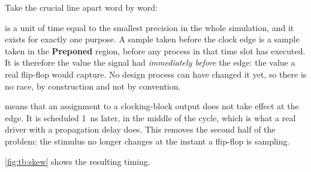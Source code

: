 Take the crucial line apart word by word:


\textbf{} is a unit of time equal to the smallest precision in
the whole simulation, and it exists for exactly one purpose. A sample taken
 before the clock edge is a sample taken in the
\textbf{Preponed} region, before any process in that time slot has executed.
It is therefore the value the signal had \emph{immediately before} the edge:
the value a real flip-flop would capture. No design process can have changed
it yet, so there is no race, by construction and not by convention.

\textbf{} means that an assignment to a clocking-block
output does not take effect at the edge. It is scheduled \SI{1}{\nano\second}
later, in the middle of the cycle, which is what a real driver with a
propagation delay does. This removes the second half of the problem: the
stimulus no longer changes at the instant a flip-flop is sampling.

\cref{fig:tb:skew} shows the resulting timing.

